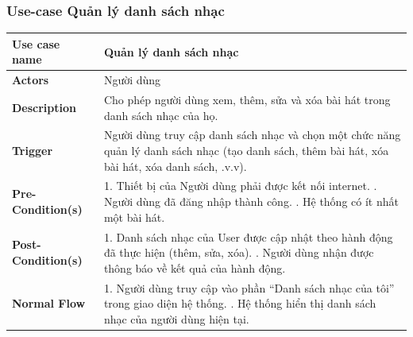 \documentclass[a4paper]{article}
\begin{document}
\subsubsection{Use-case Quản lý danh sách nhạc}
\begin{table}[H]
	\centering
	\renewcommand{\arraystretch}{1.3} %
	\begin{tabularx}{\textwidth}{|l|X|}
		\hline
		\textbf{Use case name} & Quản lý danh sách nhạc                                                                                                                                                             \\ \hline
		\textbf{Actors}        & Người dùng                                                                                                                                                                         \\ \hline
		\textbf{Description}   & Cho phép người dùng xem, thêm, sửa và xóa bài hát trong danh sách nhạc của họ.                                                                                                     \\ \hline
		\textbf{Trigger}       & Người dùng truy cập danh sách nhạc và chọn một chức năng quản lý danh sách nhạc (tạo danh sách, thêm bài hát, xóa bài hát, xóa danh sách, .v.v).                                   \\ \hline
		\textbf{Pre-Condition(s)}
		                       & 1. Thiết bị của Người dùng phải được kết nối internet. \newline
		2. Người dùng đã đăng nhập thành công. \newline
		3. Hệ thống có ít nhất một bài hát.                                                                                                                                                                         \\ \hline
		\textbf{Post-Condition(s)}
		                       & 1. Danh sách nhạc của User được cập nhật theo hành động đã thực hiện (thêm, sửa, xóa). \newline
		2. Người dùng nhận được thông báo về kết quả của hành động.                                                                                                                                                 \\ \hline
		\textbf{Normal Flow}
		                       & 1. Người dùng truy cập vào phần “Danh sách nhạc của tôi” trong giao diện hệ thống. \newline
		2. Hệ thống hiển thị danh sách nhạc của người dùng hiện tại. \newline

\end{tabularx}
\end{table}
\end{document}
